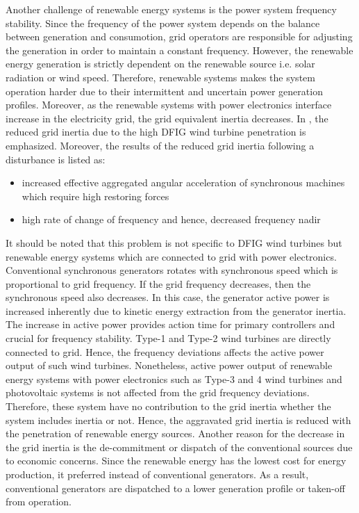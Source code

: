 Another challenge of renewable energy systems  is the power system frequency stability. Since the frequency of the power system depends on the balance between generation and consumotion, grid operators are responsible for adjusting the generation in order to maintain a constant frequency. However, the renewable energy generation is strictly dependent on the renewable source i.e. solar radiation or wind speed. Therefore, renewable systems makes the system operation harder due to their intermittent and uncertain power generation profiles. Moreover, as the renewable systems with power electronics interface increase in the electricity grid, the grid equivalent inertia decreases. In \cite{Gautam2011}, the reduced grid inertia due to the high DFIG wind turbine penetration is emphasized. Moreover, the results of the reduced grid inertia following a disturbance is listed as: 

\begin{itemize}
	\item increased effective aggregated angular acceleration of synchronous machines which require high restoring forces
	\item high rate of change of frequency and hence, decreased frequency nadir
\end{itemize}

It should be noted that this problem is not specific to DFIG wind turbines but renewable energy systems which are connected to grid with power electronics. Conventional synchronous generators rotates with synchronous speed which is proportional to grid frequency. If the grid frequency decreases, then the synchronous speed also decreases. In this case, the generator active power is increased inherently due to kinetic energy extraction from the generator inertia. The increase in active power provides action time for primary controllers and crucial for frequency stability. Type-1 and Type-2 wind turbines are directly connected to grid. Hence, the frequency deviations affects the active power output of such wind turbines\cite{Muljadi2012}. Nonetheless, active power output of renewable energy systems with power electronics such as Type-3 and 4 wind turbines and photovoltaic systems is not affected from the grid frequency deviations. Therefore, these system have no contribution to the grid inertia whether the system includes inertia or not. Hence, the aggravated grid inertia is reduced with the penetration of renewable energy sources. Another reason for the decrease in the grid inertia is the de-commitment or dispatch of the conventional sources due to economic concerns. Since the renewable energy has the lowest cost for energy production, it preferred instead of conventional generators. As a result, conventional generators are dispatched to a lower generation profile or taken-off from operation.


